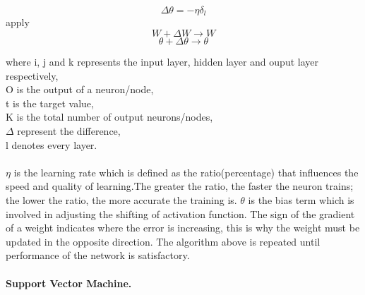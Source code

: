 {\begin{enumerate}[(i)]
                \begin{equation}
                        \Delta \theta = -\eta \delta_l
                \end{equation}
                apply
                \begin{equation}
                        W + \Delta W \to W
                \end{equation}
                \begin{equation}
                        \theta + \Delta\theta \to \theta
                \end{equation}
\end{enumerate}
where i, j and k represents the input layer, hidden layer and ouput layer respectively,\\
O is the output of a neuron/node,\\
t is the target value,\\
K is the total number of output neurons/nodes,\\
$\Delta$ represent the difference,\\
l denotes every layer.\\
\\
$\eta$ is the learning rate which is defined as the ratio(percentage) that influences the speed and quality of learning.The greater the ratio, the faster the neuron trains;
the lower the ratio, the more accurate the training is. $\theta$ is the bias term which is involved in adjusting the shifting of activation function. The sign of the gradient
of a weight indicates where the error is increasing, this is why the weight must be updated in the opposite direction. The algorithm above is
repeated until performance of the network is satisfactory.

\paragraph{Support Vector Machine.}

}
